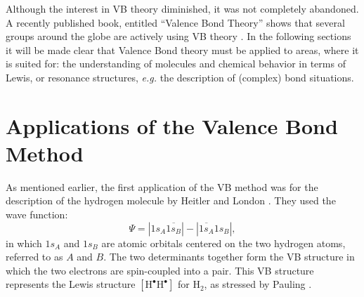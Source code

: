 Although the interest in VB theory diminished, it was not completely abandoned. A recently published book, entitled ``Valence Bond Theory'' shows that several groups around the globe are actively using VB theory \cite{cooperbook}. In the following sections it will be made clear that Valence Bond theory must be applied to areas, where it is suited for: the understanding of molecules and chemical behavior in terms of Lewis, or resonance structures, \textit{e.g.} the description of (complex) bond situations.

\section{Applications of the Valence Bond Method}

As mentioned earlier, the first application of the VB method was for the description of the hydrogen molecule by Heitler and London \cite{heitler}. They used the wave function:
\begin{equation}
\Psi = |1s_{A}\overline{1s_{B}}| - |\overline{1s_{A}}1s_{B}|,
\label{ch1.eq.hl}
\end{equation}
in which $1s_{A}$ and $1s_{B}$ are atomic orbitals centered on the two hydrogen atoms, referred to as $A$ and $B$. The two determinants together form the VB structure in which the two electrons are spin-coupled into a pair. This VB structure represents the Lewis structure $\mathrm{[H^\bullet H^\bullet]}$ for H$_2$, as stressed by Pauling \cite{hllewis}. 

